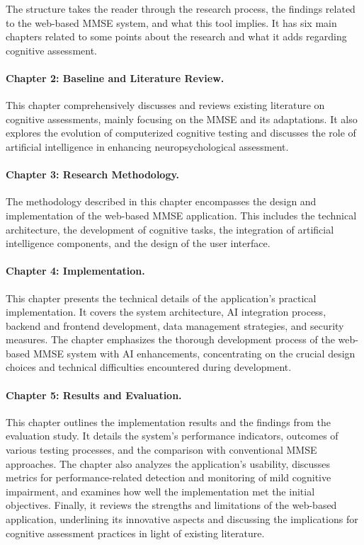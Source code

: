 The structure takes the reader through the research process, the findings related to the web-based MMSE system, and what this tool implies. It has six main chapters related to some points about the research and what it adds regarding cognitive assessment.

\paragraph{Chapter 2: Baseline and Literature Review.} This chapter comprehensively discusses and reviews existing literature on cognitive assessments, mainly focusing on the MMSE and its adaptations. It also explores the evolution of computerized cognitive testing and discusses the role of artificial intelligence in enhancing neuropsychological assessment.

\paragraph{Chapter 3: Research Methodology.} The methodology described in this chapter encompasses the design and implementation of the web-based MMSE application. This includes the technical architecture, the development of cognitive tasks, the integration of artificial intelligence components, and the design of the user interface.

\paragraph{Chapter 4: Implementation.} This chapter presents the technical details of the application's practical implementation. It covers the system architecture, AI integration process, backend and frontend development, data management strategies, and security measures. The chapter emphasizes the thorough development process of the web-based MMSE system with AI enhancements, concentrating on the crucial design choices and technical difficulties encountered during development.

\paragraph{Chapter 5: Results and Evaluation.} This chapter outlines the implementation results and the findings from the evaluation study. It details the system's performance indicators, outcomes of various testing processes, and the comparison with conventional MMSE approaches. The chapter also analyzes the application's usability, discusses metrics for performance-related detection and monitoring of mild cognitive impairment, and examines how well the implementation met the initial objectives. Finally, it reviews the strengths and limitations of the web-based application, underlining its innovative aspects and discussing the implications for cognitive assessment practices in light of existing literature.

